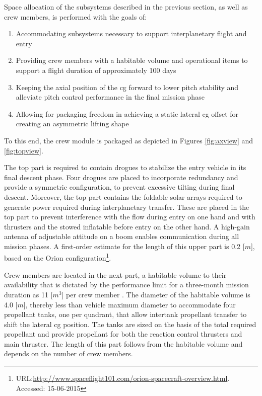 Space allocation of the subsystems described in the previous section, as well as crew members, is performed with the goals of:
\begin{enumerate}
\item Accommodating subsystems necessary to support interplanetary flight and entry
\item Providing crew members with a habitable volume and operational items to support a flight duration of approximately 100 days
\item Keeping the axial position of the \gls{cg} forward to lower pitch stability and alleviate pitch control performance in the final mission phase
\item Allowing for packaging freedom in achieving a static lateral \gls{cg} offset for creating an asymmetric lifting shape
\end{enumerate}
To this end, the crew module is packaged as depicted in Figures \ref{fig:axview} and \ref{fig:topview}. 

The top part is required to contain drogues to stabilize the entry vehicle in its final descent phase. Four drogues are placed to incorporate redundancy and provide
a symmetric configuration, to prevent excessive tilting during final descent. Moreover, the top part contains the foldable solar arrays required to generate power required during interplanetary transfer. These are placed in the top part to prevent interference with the flow during entry on one hand and with thrusters and the stowed inflatable before entry on the other hand. A high-gain antenna of adjustable attitude on a boom enables communication during all mission phases. A first-order estimate for the length of this upper part is 0.2 [$m$], based on the Orion configuration\footnote{URL:\url{http://www.spaceflight101.com/orion-spacecraft-overview.html}. Accessed: 15-06-2015}.

Crew members are located in the next part, a habitable volume to their availability that is dictated by the performance limit for a three-month mission duration as 11 [$m^{3}$] per crew member \cite{Rudisill2008}. The diameter of the habitable volume is 4.0 [$m$], thereby less than vehicle maximum diameter to accommodate four propellant tanks, one per quadrant, that allow intertank propellant transfer to shift the lateral \gls{cg} position. The tanks are sized on the basis of the total required propellant and provide propellant for both the reaction control thrusters and main thruster. The length of this part follows from the habitable volume and depends on the number of crew members.

